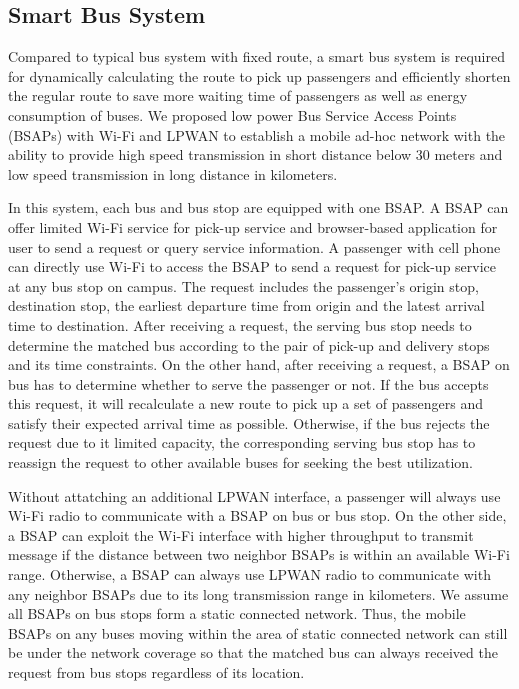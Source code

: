\documentclass[runningheads]{llncs}
\begin{document}
\subsection{Smart Bus System}
Compared to typical bus system with fixed route, a smart bus system is required for dynamically calculating the route to pick up passengers and efficiently shorten the regular route to save more waiting time of passengers as well as energy consumption of buses. We proposed low power Bus Service Access Points (BSAPs) with Wi-Fi and LPWAN to establish a mobile ad-hoc network with the ability to provide high speed transmission in short distance below 30 meters and low speed transmission in long distance in kilometers.

In this system, each bus and bus stop are equipped with one BSAP. A BSAP can offer limited Wi-Fi service for pick-up service and browser-based application for user to send a request or query service information. A passenger with cell phone can directly use Wi-Fi to access the BSAP to send a request for pick-up service at any bus stop on campus. The request includes the passenger’s origin stop, destination stop, the earliest departure time from origin and the latest arrival time to destination. After receiving a request, the serving bus stop needs to determine the matched bus according to the pair of pick-up and delivery stops and its time constraints. On the other hand, after receiving a request, a BSAP on bus has to determine whether to serve the passenger or not. If the bus accepts this request, it will recalculate a new route to pick up a set of passengers and satisfy their expected arrival time as possible. Otherwise, if the bus rejects the request due to it limited capacity, the corresponding serving bus stop has to reassign the request to other available buses for seeking the best utilization.

Without attatching an additional LPWAN interface, a passenger will always use Wi-Fi radio to communicate with a BSAP on bus or bus stop. On the other side, a BSAP can exploit the Wi-Fi interface with higher throughput to transmit message if the distance between two neighbor BSAPs is within an available Wi-Fi range. Otherwise, a BSAP can always use LPWAN radio to communicate with any neighbor BSAPs due to its long transmission range in kilometers. We assume all BSAPs on bus stops form a static connected network. Thus, the mobile BSAPs on any buses moving within the area of static connected network can still be under the network coverage so that the matched bus can always received the request from bus stops regardless of its location.
\end{document}
